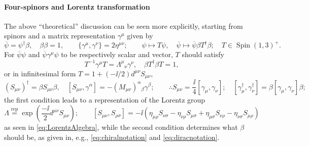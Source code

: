 \documentclass[CheatSheet]{subfiles}
\newcommand{\LorTr}[2]{\Lambda^{#1}{}_{#2}}
\begin{document}
\paragraph{Four-spinors and Lorentz transformation}
The above ``theoretical'' discussion can be seen more explicitly, starting from spinors and a matrix representation $\gamma^\mu$ given by
\begin{equation}
 \overline\psi = \psi^\dagger\beta, \quad\beta\beta=1,\qquad
\{\gamma^\mu,\gamma^\nu\}=2\eta^{\mu\nu};\qquad
\psi\mapsto T\psi,\quad
\overline\psi\mapsto \overline\psi\beta T^\dagger \beta;\quad T\in \mathop{\mathrm{Spin}}(1,3)^+.
\end{equation}
For $\overline\psi\psi$ and $\overline\psi\gamma^\mu\psi$ to be respectively scalar and vector, $T$ should satisfy
\begin{equation}
 T^{-1}\gamma^\mu T = \LorTr\mu\nu\gamma^\nu,\quad
 \beta T^\dagger \beta T=1,
\end{equation}
or in infinitesimal form $T=1+(-\ii/2)d^{\mu\nu}S_{\mu\nu}$,
\begin{equation}
 (S_{\mu\nu})^\dagger = \beta S_{\mu\nu} \beta,\quad
[S_{\mu\nu},\gamma^\alpha] = -(M_{\mu\nu})^{\alpha}{}_\beta\gamma^\beta;
\qquad
\therefore S_{\mu\nu}=\frac{\ii}{4}[\gamma_\mu,\gamma_\nu];
\quad
[\gamma_\mu^\dagger, \gamma_\nu^\dagger]=\beta[\gamma_\mu,\gamma_\nu]\beta;
\label{eq:betacondition}
\end{equation}
the first condition leads to a representation of the Lorentz group
\begin{equation}
\Lambda\stackrel{\text{rep}}=
 \exp\left(\frac{-\ii}{2}d^{\mu\nu}S_{\mu\nu}\right);\qquad
 [S_{\mu\nu},S_{\rho\sigma}] = -\ii\left(
\eta_{\mu\rho} S_{\nu\sigma}
-\eta_{\nu\rho} S_{\mu\sigma}
+\eta_{\mu\sigma} S_{\nu\rho}
-\eta_{\nu\sigma} S_{\mu\rho}\right)
\end{equation}
as seen in \cref{eq:LorentzAlgebra}, while the second condition determines what $\beta$ should be, as given in, e.g., \cref{eq:chiralnotation} and \cref{eq:diracnotation}.
\end{document}
